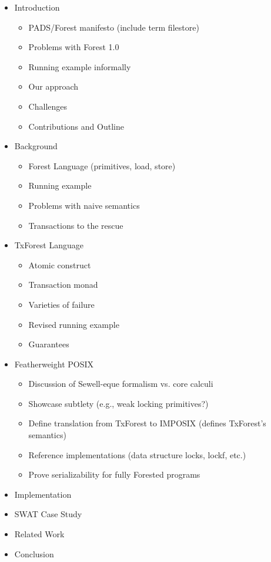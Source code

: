 \documentclass[nocopyrightspace]{sigplanconf}
\begin{document}
\begin{itemize}
\item Introduction
\begin{itemize}
\item PADS/Forest manifesto  (include term filestore)
\item Problems with Forest 1.0
\item Running example informally
\item Our approach
\item Challenges
\item Contributions and Outline
\end{itemize}
\item Background
\begin{itemize}
\item Forest Language (primitives, load, store)
\item Running example 
\item Problems with naive semantics
\item Transactions to the rescue
\end{itemize}
\item TxForest Language
\begin{itemize}
\item Atomic construct 
\item Transaction monad
\item Varieties of failure
\item Revised running example
\item Guarantees
\end{itemize}
\item Featherweight POSIX
\begin{itemize}
\item Discussion of Sewell-eque formalism vs. core calculi  
\item Showcase subtlety (e.g., weak locking primitives?)
\item Define translation from TxForest to IMPOSIX (defines TxForest's semantics)
\item Reference implementations (data structure locks, lockf, etc.)
\item Prove serializability for fully Forested programs
\end{itemize}
\item Implementation
\item SWAT Case Study
\item Related Work
\item Conclusion
\end{itemize}



 
\balance  

\end{document}
